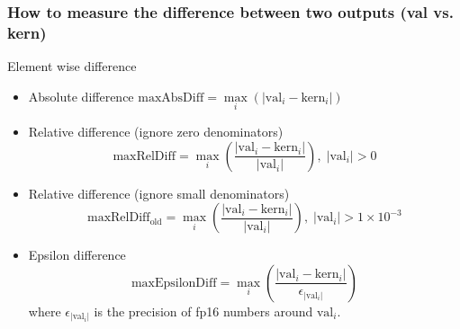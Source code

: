 \documentclass[t, pdftex, aspectratio=169]{beamer}  %
\begin{document}
\begin{frame}
  \frametitle{How to measure the difference between two outputs (val vs. kern)}

  Element wise difference
  \begin{itemize}
  \item Absolute difference $\text{maxAbsDiff} = \max\limits_i(|\text{val}_i - \text{kern}_i|)$
  \item Relative difference (ignore zero denominators)
    \begin{equation}
      \text{maxRelDiff} = \max\limits_i(\frac{|\text{val}_i - \text{kern}_i|}{|\text{val}_i|}), \; |\text{val}_i|>0\nonumber
    \end{equation}
  \item Relative difference (ignore small denominators)
    \begin{equation}
      \text{maxRelDiff}_\text{old} = \max\limits_i(\frac{|\text{val}_i - \text{kern}_i|}{|\text{val}_i|}), \; |\text{val}_i|>1\times10^{-3}\nonumber
    \end{equation}
  \item Epsilon difference
    \begin{equation}
      \text{maxEpsilonDiff} = \max\limits_i(\frac{|\text{val}_i - \text{kern}_i|}{\epsilon_{|\text{val}_i|}})\nonumber
    \end{equation}
    where $\epsilon_{|\text{val}_i|}$ is the precision of fp16 numbers around $\text{val}_i$.
  \end{itemize}
  
\end{frame}

\end{document}
